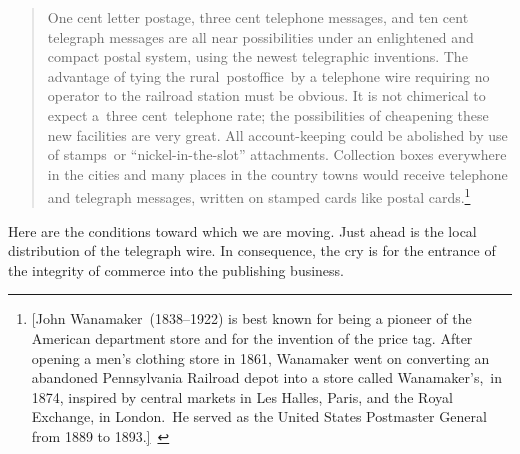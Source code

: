 \documentclass[twoside,symmetric,nobib,justified]{tufte-book}
\begin{document}
\begin{quote}
One cent letter postage, three cent telephone messages, and ten cent
telegraph messages are all near possibilities under an enlightened and
compact postal system, using the newest telegraphic inventions. The
advantage of tying the rural~postoffice~by a telephone wire requiring no
operator to the railroad station must be obvious. It is not chimerical
to expect a~three cent~telephone rate; the possibilities of cheapening
these new facilities are very great. All account-keeping could be
abolished by use of stamps~or ``nickel-in-the-slot'' attachments.
Collection boxes everywhere in the cities and many places in the country
towns would receive telephone and telegraph messages, written on stamped
cards like postal cards.\footnote{{[}John Wanamaker~(1838--1922) is best
  known for being a pioneer of the American department store and for the
  invention of the price tag. After opening a men's clothing store in
  1861, Wanamaker went on converting an abandoned Pennsylvania Railroad
  depot into a store called Wanamaker's,~in 1874, inspired by central
  markets in Les Halles, Paris, and the Royal Exchange, in London.~He
  served as the United States Postmaster General from 1889 to
  1893.\href{applewebdata://D02306DF-3E46-4684-BD1A-1A323FFB2CB2\#_msocom_1}{{]}}~}
\end{quote}

\noindent Here are the conditions toward which we are moving. Just ahead is the
local distribution of the telegraph wire. In consequence, the cry is for
the entrance of the integrity of commerce into the publishing business.~
\end{document}
